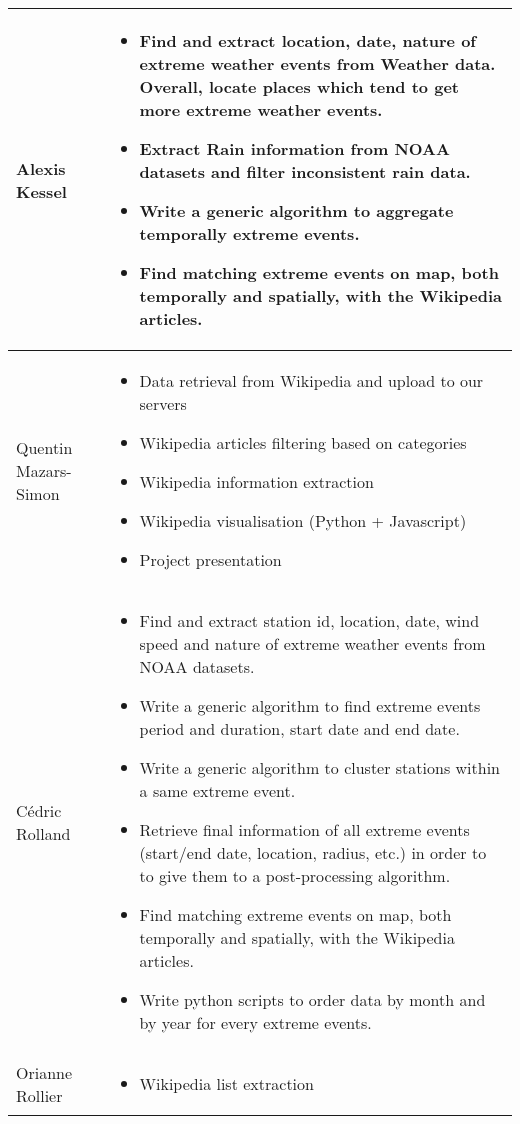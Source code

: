 \begin{longtable}{|l|p{10.5cm}|}
\hline
Alexis Kessel & \begin{itemize}
	\item Find and extract location, date, nature of extreme weather events from Weather data. Overall, locate places which tend to get more extreme weather events.
	\item Extract Rain information from NOAA datasets and filter inconsistent rain data.
	\item Write a generic algorithm to aggregate temporally extreme events.
	\item Find matching extreme events on map, both temporally and spatially, with the Wikipedia articles.
\end{itemize}\\
\hline
Quentin Mazars-Simon & \begin{itemize}
	\item Data retrieval from Wikipedia and upload to our servers
	\item Wikipedia articles filtering based on categories
	\item Wikipedia information extraction
	\item Wikipedia visualisation (Python + Javascript)
	\item Project presentation
\end{itemize}\\
\hline
Cédric Rolland &  \begin{itemize}
	\item Find and extract station id, location, date, wind speed and nature of extreme weather events from NOAA datasets.
	\item Write a generic algorithm to find extreme events period and duration, start date and end date.
	\item Write a generic algorithm to cluster stations within a same extreme event.
	\item Retrieve final information of all extreme events (start/end date, location, radius, etc.) in order to to give them to a post-processing algorithm.
	\item Find matching extreme events on map, both temporally and spatially, with the Wikipedia articles.
	\item Write python scripts to order data by month and by year for every extreme events.
\end{itemize}\\
\hline
Orianne Rollier &
\begin{itemize}
	\item Wikipedia list extraction

\end{itemize}
\end{longtable}
